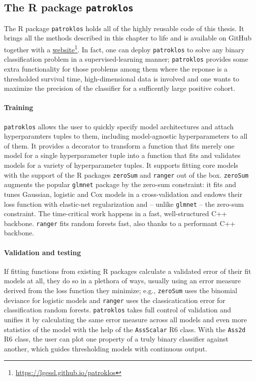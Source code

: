 \subsection{The R package \texttt{patroklos}}
The R package \texttt{patroklos} holds all of the highly reusable code of this thesis. It brings 
all the methods described in this chapter to life and is available on GitHub \cite{patroklos-gh} 
together with a 
\href{https://lgessl.github.io/patroklos/}{website}\footnote{\url{https://lgessl.github.io/patroklos}}. 
In fact, one can deploy 
\texttt{patroklos} to solve any binary classification problem in a supervised-learning manner;
\texttt{patroklos} provides some extra functionality for those problems among them where the 
reponse is a thresholded survival time, high-dimensional data is involved and one wants to maximize 
the precision of the classifier for a sufficently large positive cohort.

\paragraph{Training} 
\texttt{patroklos} allows the user to quickly specify model architectures and 
attach hyperparamters tuples to them, including model-agnostic hyperparameters to all of them. It 
provides a decorator to transform a function that fits merely one model for a single hyperparameter 
tuple into a function that fits and validates models for a variety of hyperparameter tuples. 
It supports fitting core models with the support of the R packages \texttt{zeroSum} 
\cite{zerosumR} and \texttt{ranger} \cite{ranger-gh} out of the box. \texttt{zeroSum} 
augments the popular \texttt{glmnet} package by the zero-sum constraint: it fits and 
tunes Gaussian, logistic and Cox models in a cross-validation and endows their loss function 
with elastic-net regularization and -- unlike \texttt{glmnet} -- the zero-sum 
constraint. The time-critical work happens in a fast, well-structured C++ backbone. 
\texttt{ranger} fits random forests fast, also thanks to a performant C++ backbone. 

\paragraph{Validation and testing} 
If fitting functions from existing R packages calculate a validated error of 
their fit models at all, they do so in a plethora of ways, usually using an error measure derived 
from the loss function they minimize; e.g., \texttt{zeroSum} uses the binomial deviance for 
logistic models and \texttt{ranger} uses the classicatication error for classification random 
forests. \texttt{patroklos} takes 
full control of validation and unifies it
by calculating the same error measure across all models and even more statistics of the model
with the help of the \texttt{AssScalar} R6 class. With the \texttt{Ass2d} R6 class, the 
user can plot one property of a truly binary classifier against another, which guides 
thresholding models with continuous output.

